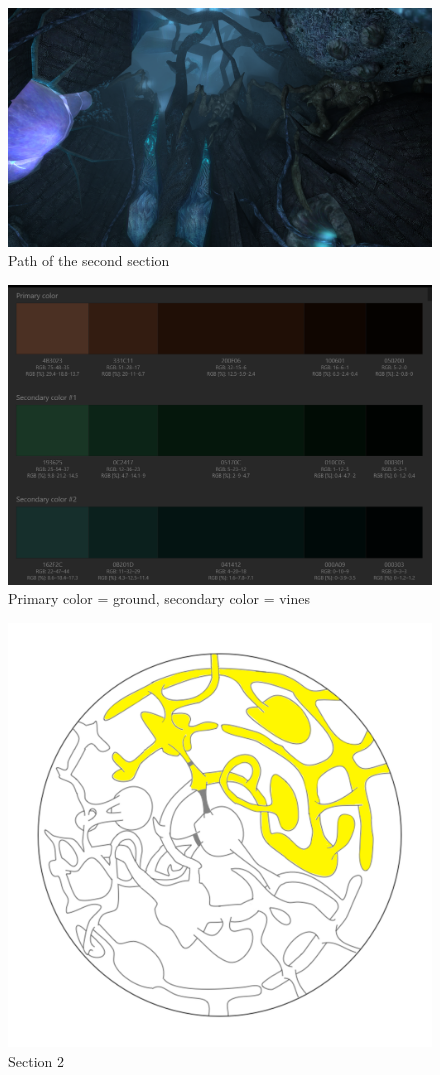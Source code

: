 \vspace*{0.3cm}
\begin{figure}[H]
	\centering
	\includegraphics[width=0.8\linewidth]{images/visual_ref/15_giant_chasm/chasm_section_2.png}
	\caption*{Path of the second section}
\end{figure}

\begin{figure}[H]
	\centering
	\includegraphics[width=0.8\linewidth]{images/visual_ref/15_giant_chasm/pallette/pallette_section_02.png}
	\caption*{Primary color = ground, secondary color = vines}
\end{figure}

\begin{figure}[H]
	\centering
	\includegraphics[width=0.7\linewidth]{images/map/2D_map_section_02.png}
	\caption*{Section 2}
\end{figure}

